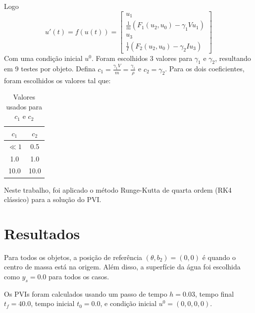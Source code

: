 \documentclass[
	12pt,				%
	oneside,			%
	a4paper,			%
	]{article}
\begin{document}
    Logo
    \[
        u'(t) = f(u(t)) = \begin{bmatrix}
            u_1 \\
            \frac{1}{m} (F_1(u_2, u_0) - \gamma_1 V u_1) \\
            u_3 \\
            \frac{1}{I}(F_2(u_2, u_0) - \gamma_2 I u_3)
        \end{bmatrix}
    \]
    Com uma condição inicial $u^0$. Foram escolhidos 3 valores para $\gamma_1$ e $\gamma_2$, resultando em 9 testes por objeto. Defina $c_1 = \frac{\gamma_1 V}{m} = \frac{\gamma_1}{\rho}$ e $c_2 = \gamma_2$. Para os dois coeficientes, foram escolhidos os valores tal que:
    \begin{table}[H]
        \centering
        \begin{tabular}{cc} \\

            
            \hline
            $c_1$ & $c_2$ \\

            \hline
            $\ll 1$ & 0.5 \\
            1.0 & 1.0 \\
            10.0 & 10.0 \\

            \hline
        \end{tabular}
        \caption{Valores usados para $c_1$ e $c_2$}
    \end{table}

    Neste trabalho, foi aplicado o método Runge-Kutta de quarta ordem (RK4 clássico) para a solução do PVI.













    \section{Resultados}
    Para todos os objetos, a posição de referência $(\theta, b_2) = (0,0)$ é quando o centro de massa está na origem. Além disso, a superfície da água foi escolhida como $y_s = 0.0$ para todos os casos.

    Os PVIs foram calculados usando um passo de tempo $h = 0.03$, tempo final $t_f = 40.0$, tempo inicial $t_0 = 0.0$, e condição inicial $u^0 = (0,0,0,0)$.
\end{document}
